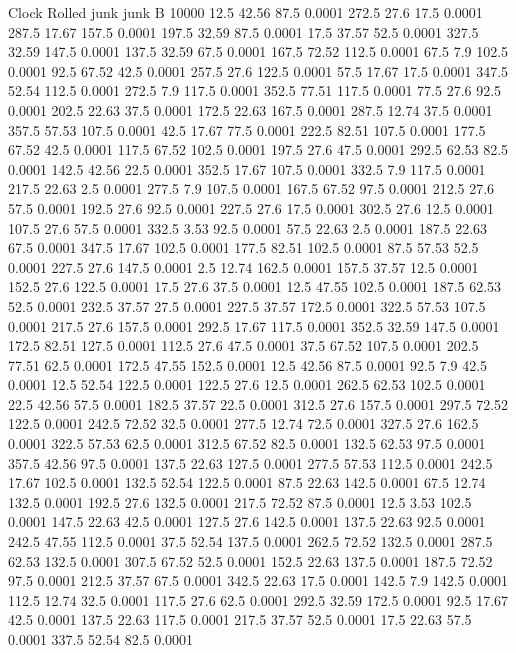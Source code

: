 Clock Rolled			
junk			
junk			
B	10000		
12.5	42.56	87.5	0.0001
272.5	27.6	17.5	0.0001
287.5	17.67	157.5	0.0001
197.5	32.59	87.5	0.0001
17.5	37.57	52.5	0.0001
327.5	32.59	147.5	0.0001
137.5	32.59	67.5	0.0001
167.5	72.52	112.5	0.0001
67.5	7.9	102.5	0.0001
92.5	67.52	42.5	0.0001
257.5	27.6	122.5	0.0001
57.5	17.67	17.5	0.0001
347.5	52.54	112.5	0.0001
272.5	7.9	117.5	0.0001
352.5	77.51	117.5	0.0001
77.5	27.6	92.5	0.0001
202.5	22.63	37.5	0.0001
172.5	22.63	167.5	0.0001
287.5	12.74	37.5	0.0001
357.5	57.53	107.5	0.0001
42.5	17.67	77.5	0.0001
222.5	82.51	107.5	0.0001
177.5	67.52	42.5	0.0001
117.5	67.52	102.5	0.0001
197.5	27.6	47.5	0.0001
292.5	62.53	82.5	0.0001
142.5	42.56	22.5	0.0001
352.5	17.67	107.5	0.0001
332.5	7.9	117.5	0.0001
217.5	22.63	2.5	0.0001
277.5	7.9	107.5	0.0001
167.5	67.52	97.5	0.0001
212.5	27.6	57.5	0.0001
192.5	27.6	92.5	0.0001
227.5	27.6	17.5	0.0001
302.5	27.6	12.5	0.0001
107.5	27.6	57.5	0.0001
332.5	3.53	92.5	0.0001
57.5	22.63	2.5	0.0001
187.5	22.63	67.5	0.0001
347.5	17.67	102.5	0.0001
177.5	82.51	102.5	0.0001
87.5	57.53	52.5	0.0001
227.5	27.6	147.5	0.0001
2.5	12.74	162.5	0.0001
157.5	37.57	12.5	0.0001
152.5	27.6	122.5	0.0001
17.5	27.6	37.5	0.0001
12.5	47.55	102.5	0.0001
187.5	62.53	52.5	0.0001
232.5	37.57	27.5	0.0001
227.5	37.57	172.5	0.0001
322.5	57.53	107.5	0.0001
217.5	27.6	157.5	0.0001
292.5	17.67	117.5	0.0001
352.5	32.59	147.5	0.0001
172.5	82.51	127.5	0.0001
112.5	27.6	47.5	0.0001
37.5	67.52	107.5	0.0001
202.5	77.51	62.5	0.0001
172.5	47.55	152.5	0.0001
12.5	42.56	87.5	0.0001
92.5	7.9	42.5	0.0001
12.5	52.54	122.5	0.0001
122.5	27.6	12.5	0.0001
262.5	62.53	102.5	0.0001
22.5	42.56	57.5	0.0001
182.5	37.57	22.5	0.0001
312.5	27.6	157.5	0.0001
297.5	72.52	122.5	0.0001
242.5	72.52	32.5	0.0001
277.5	12.74	72.5	0.0001
327.5	27.6	162.5	0.0001
322.5	57.53	62.5	0.0001
312.5	67.52	82.5	0.0001
132.5	62.53	97.5	0.0001
357.5	42.56	97.5	0.0001
137.5	22.63	127.5	0.0001
277.5	57.53	112.5	0.0001
242.5	17.67	102.5	0.0001
132.5	52.54	122.5	0.0001
87.5	22.63	142.5	0.0001
67.5	12.74	132.5	0.0001
192.5	27.6	132.5	0.0001
217.5	72.52	87.5	0.0001
12.5	3.53	102.5	0.0001
147.5	22.63	42.5	0.0001
127.5	27.6	142.5	0.0001
137.5	22.63	92.5	0.0001
242.5	47.55	112.5	0.0001
37.5	52.54	137.5	0.0001
262.5	72.52	132.5	0.0001
287.5	62.53	132.5	0.0001
307.5	67.52	52.5	0.0001
152.5	22.63	137.5	0.0001
187.5	72.52	97.5	0.0001
212.5	37.57	67.5	0.0001
342.5	22.63	17.5	0.0001
142.5	7.9	142.5	0.0001
112.5	12.74	32.5	0.0001
117.5	27.6	62.5	0.0001
292.5	32.59	172.5	0.0001
92.5	17.67	42.5	0.0001
137.5	22.63	117.5	0.0001
217.5	37.57	52.5	0.0001
17.5	22.63	57.5	0.0001
337.5	52.54	82.5	0.0001
